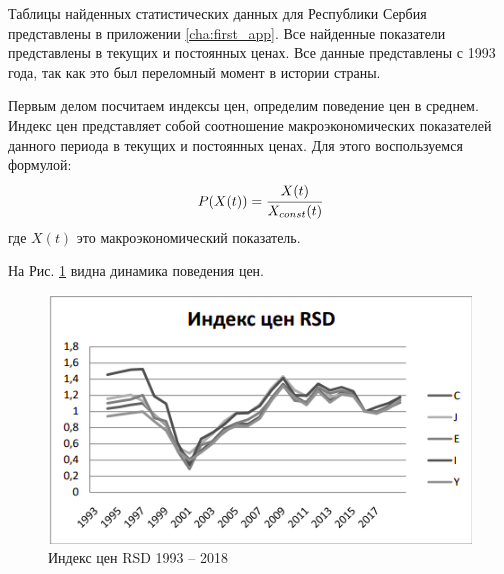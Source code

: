 Таблицы найденных статистических данных для Республики Сербия представлены в приложении \ref{cha:first_app}.
Все найденные показатели представлены в текущих и постоянных ценах.
Все данные представлены с 1993 года, так как это был переломный момент в истории страны.

Первым делом посчитаем индексы цен, определим поведение цен в среднем.
Индекс цен представляет собой соотношение макроэкономических показателей данного периода в текущих и постоянных ценах.
Для этого воспользуемся формулой:
\begin{equation}
	P(X(t)) = \cfrac{X(t)}{X_{const}(t)}
\label{F:F1}
\end{equation}
где $X(t)$ это макроэкономический показатель.

На Рис. \ref{fig:index_rsd} видна динамика поведения цен.
\begin{figure}
	\centering
	\includegraphics[width=\textwidth]{figures/index_rsd.png}
	\caption{Индекс цен RSD 1993 -- 2018}
	\label{fig:index_rsd}
\end{figure}
